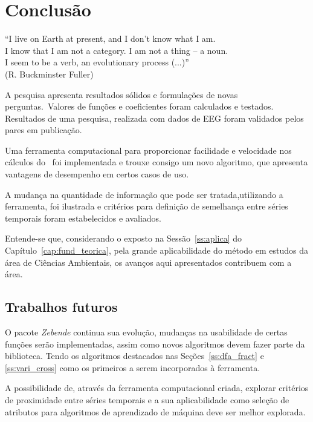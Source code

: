 \chapter{Conclusão}
\label{cap:coclusion}

\begin{flushright}
    ``I live on Earth at present, and I don’t know what I am. \\
    I know that I am not a category. I am not a thing -- a noun.\\ 
    I seem to be a verb, an evolutionary process (...)''\\[10px]
    (R. Buckminster Fuller)
    \end{flushright}

A pesquisa apresenta resultados sólidos e formulações de novas perguntas.~Valores de funções e coeficientes foram calculados e testados. Resultados de uma pesquisa, realizada com dados de EEG foram validados pelos pares em publicação.

Uma ferramenta computacional para proporcionar facilidade e velocidade nos cálculos do \dmc~foi implementada e trouxe consigo um novo algoritmo, que apresenta vantagens de desempenho em certos casos de uso.

A mudança na quantidade de informação que pode ser tratada,utilizando a ferramenta, foi ilustrada e critérios para definição de semelhança entre séries temporais foram estabelecidos e avaliados.

Entende-se que, considerando o exposto na Sessão~\ref{ss:aplica} do Capítulo~\ref{cap:fund_teorica}, pela grande aplicabilidade do método em estudos da área de Ciências Ambientais, os avanços aqui apresentados contribuem com a área.

\section{Trabalhos futuros}

O pacote \emph{Zebende} continua sua evolução, mudanças na usabilidade de certas funções serão implementadas, assim como novos algoritmos devem fazer parte da biblioteca. Tendo os algoritmos destacados nas Seções~\ref{ss:dfa_fract} e \ref{ss:vari_cross} como os primeiros a serem incorporados à ferramenta.

A possibilidade de, através da ferramenta computacional criada, explorar critérios de proximidade entre séries temporais e a sua aplicabilidade como seleção de atributos para algoritmos de aprendizado de máquina deve ser melhor explorada.